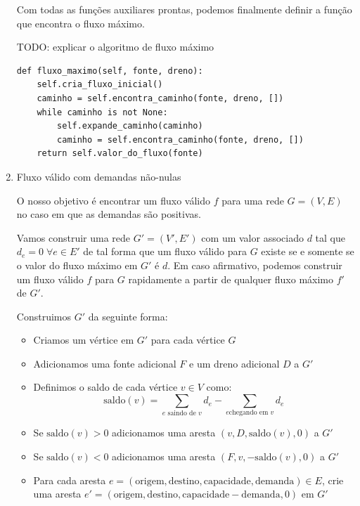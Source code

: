 \documentclass[11pt]{article}
\begin{document}
\begin{enumerate}
Com todas as funções auxiliares prontas, podemos finalmente definir a
função que encontra o fluxo máximo.

TODO: explicar o algoritmo de fluxo máximo
\begin{verbatim}
def fluxo_maximo(self, fonte, dreno):
    self.cria_fluxo_inicial()
    caminho = self.encontra_caminho(fonte, dreno, [])
    while caminho is not None:
        self.expande_caminho(caminho)
        caminho = self.encontra_caminho(fonte, dreno, [])
    return self.valor_do_fluxo(fonte)
\end{verbatim}

\item Fluxo válido com demandas não-nulas
\label{sec-3-3-3-2}

O nosso objetivo é encontrar um fluxo válido $f$ para uma rede $G =
(V, E)$ no caso em que as demandas são positivas.

Vamos construir uma rede $G' = (V', E')$ com um valor associado $d$
tal que $d_e = 0 \; \forall e \in E'$ de tal forma que um fluxo válido
para $G$ existe se e somente se o valor do fluxo máximo em $G'$ é
$d$. Em caso afirmativo, podemos construir um fluxo válido $f$ para
$G$ rapidamente a partir de qualquer fluxo máximo $f'$ de $G'$.

Construimos $G'$ da seguinte forma:

\begin{itemize}
\item Criamos um vértice em $G'$ para cada vértice $G$
\item Adicionamos uma fonte adicional $F$ e um dreno adicional $D$ a $G'$
\item Definimos o saldo de cada vértice $v \in V$ como: \[
  \textrm{saldo}(v) = \sum_{e \text{ saindo de }v}d_e - \sum_{e \text{
  chegando em }v}d_e \]
\item Se $\mathrm{saldo}(v) > 0$ adicionamos uma aresta $(v, D,
  \mathrm{saldo}(v), 0)$ a $G'$
\item Se $\mathrm{saldo}(v) < 0$ adicionamos uma aresta $(F, v,
  -\mathrm{saldo}(v), 0)$ a $G'$
\item Para cada aresta $e = (\mathrm{origem, destino, capacidade,
  demanda}) \in E$, crie uma aresta $e' = (\mathrm{origem, destino,
  capacidade - demanda, 0})$ em $G'$
\end{itemize}


\end{enumerate}
\end{document}
